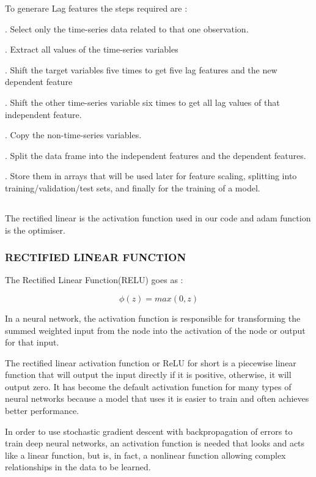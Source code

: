 \documentclass[12pt]{article}
\newcommand{\nd}{\noindent}
\newcommand{\msize}{\fontsize{14pt}{12pt}\selectfont}
\begin{document}
\nd To generare Lag features the steps required are : 

\nd 1. Select only the time-series data related to that one observation.

\nd 2. Extract all values of the time-series variables

\nd 3. Shift the target variables five times to get five lag features and the new dependent feature 

\nd 4. Shift the other time-series variable six times to get all lag values of that independent feature.

\nd 5. Copy the non-time-series variables.

\nd 6. Split the data frame into the independent features and the dependent features.

\nd 7. Store them in arrays that will be used later for feature scaling, splitting into training/validation/test sets, and finally for the training of a model.

\newpage 
\subsection{\msize{\textbf{\textbf{RELU AND ADAM FUNCTIONS }}}}
The rectified linear is the activation function used in our code and adam function is the optimiser. 
\subsubsection{\textbf{RECTIFIED LINEAR FUNCTION}}
The Rectified Linear Function(RELU) goes as : 

\begin{equation*} 
\phi(z)=max(0,z)
\end{equation*}

\nd In a neural network, the activation function is responsible for transforming the summed weighted input from the node into the activation of the node or output for that input.

\nd The rectified linear activation function or ReLU for short is a piecewise linear function that will output the input directly if it is positive, otherwise, it will output zero. It has become the default activation function for many types of neural networks because a model that uses it is easier to train and often achieves better performance.

\nd In order to use stochastic gradient descent with backpropagation of errors to train deep neural networks, an activation function is needed that looks and acts like a linear function, but is, in fact, a nonlinear function allowing complex relationships in the data to be learned.
\end{document}
